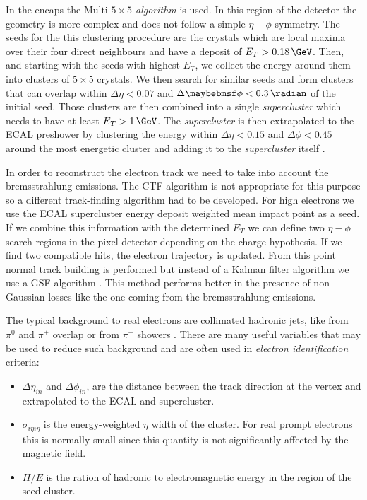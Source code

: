 In the encaps the \textit{$\text{Multi-}5 \times 5$ algorithm} is used. In this region of the detector the geometry is more complex and does not follow a simple $\eta-\phi$ symmetry. The seeds for the this clustering procedure are the crystals which are local maxima over their four direct neighbours and have a deposit of $E_T>0.18\,\GeV$. Then, and starting with the seeds with highest $E_T$, we collect the energy around them into clusters of $5 \times 5$ crystals. We then search for similar seeds and form clusters that can overlap within $\Delta\eta<0.07$ and $\Delta\phi<0.3\,\radian$ of the initial seed. Those clusters are then combined into a single \textit{supercluster} which needs to have at least $E_T>1\,\GeV$. The \textit{supercluster} is then extrapolated to the \gls{ECAL} preshower by clustering the energy within $\Delta\eta<0.15$ and $\Delta\phi<0.45$ around the most energetic cluster and adding it to the \textit{supercluster} itself \cite{ARTICLE:CMSElectronReconstruction8TeV}.

In order to reconstruct the electron track we need to take into account the bremsstrahlung emissions. The \gls{CTF} algorithm is not appropriate for this purpose so a different track-finding algorithm had to be developed. For high \pt electrons we use the \gls{ECAL} supercluster energy deposit weighted mean impact point as a seed. If we combine this information with the determined $E_T$ we can define two $\eta-\phi$ search regions in the pixel detector depending on the charge hypothesis. If we find two compatible hits, the electron trajectory is updated. From this point normal track building is performed but instead of a Kalman filter algorithm we use a \gls{GSF} algorithm \cite{ARTICLE:CMSReconstructionElectronsGSF}. This method performs better in the presence of non-Gaussian losses like the one coming from the bremsstrahlung emissions.

The typical background to real electrons are collimated hadronic jets, like from $\pi^0$ and $\pi^{\pm}$ overlap or from $\pi^{\pm}$ showers \cite{ARTICLE:CMSElectronReconstruction}. There are many useful variables that may be used to reduce such background and are often used in \textit{electron identification} criteria:

\begin{itemize}
  \item $\Delta\eta_{in}$ and $\Delta\phi_{in}$, are the distance between the track direction at the vertex and extrapolated to the \gls{ECAL} and supercluster.
  \item $\sigma_{i \eta i \eta}$ is the energy-weighted $\eta$ width of the cluster. For real prompt electrons this is normally small since this quantity is not significantly affected by the magnetic field.
  \item $H/E$ is the ration of hadronic to electromagnetic energy in the region of the seed cluster. 
\end{itemize}

